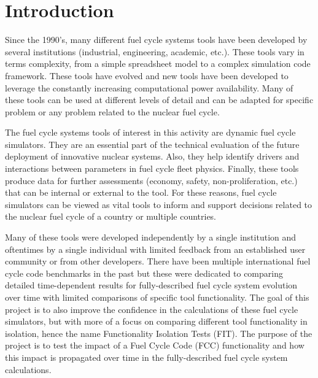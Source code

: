 \documentclass[review]{elsarticle}
\begin{document}
\section{Introduction}

Since the 1990’s, many different fuel cycle systems tools have been developed by several institutions (industrial, engineering, academic, etc.). These tools vary in terms complexity, from a simple spreadsheet model to a complex simulation code framework. These tools have evolved and new tools have been developed to leverage the constantly increasing computational power availability. Many of these tools can be used at different levels of detail and can be adapted for specific problem or any problem related to the nuclear fuel cycle.

The fuel cycle systems tools of interest in this activity are dynamic fuel cycle simulators. They are an essential part of the technical evaluation of the future deployment of innovative nuclear systems. Also, they help identify drivers and interactions between parameters in fuel cycle fleet physics. Finally, these tools produce data for further assessments (economy, safety, non-proliferation, etc.) that can be internal or external to the tool. For these reasons, fuel cycle simulators can be viewed as vital tools to inform and support decisions related to the nuclear fuel cycle of a country or multiple countries.

Many of these tools were developed independently by a single institution and oftentimes by a single individual with limited feedback from an established user community or from other developers. There have been multiple international fuel cycle code benchmarks in the past but these were dedicated to comparing detailed time-dependent results for fully-described fuel cycle system evolution over time with limited comparisons of specific tool functionality. The goal of this project is to also improve the confidence in the calculations of these fuel cycle simulators, but with more of a focus on comparing different tool functionality in isolation, hence the name Functionality Isolation Tests (FIT). The purpose of the project is to test the impact of a Fuel Cycle Code (FCC) functionality and how this impact is propagated over time in the fully-described fuel cycle system calculations.

\end{document}
